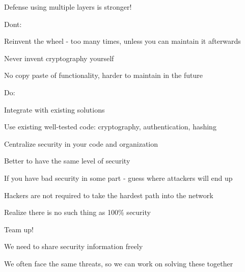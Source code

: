 \documentclass[Screen16to9,17pt]{foils}
\begin{document}


\centerline{\hlkbig Defense using multiple layers is stronger!}



\begin{list1}
\item Dont:
\begin{list2}
\item Reinvent the wheel - too many times, unless you can maintain it afterwards
\item Never invent cryptography yourself
\item No copy paste of functionality, harder to maintain in the future
\end{list2}
\item Do:
\begin{list2}
\item Integrate with existing solutions
\item Use existing well-tested code: cryptography, authentication, hashing
\item Centralize security in your code and organization
\end{list2}
\end{list1}




\begin{list1}
\item Better to have the same level of security
\item If you have bad security in some part - guess where attackers will end up
\item Hackers are not required to take the hardest path into the network
\item Realize there is no such thing as 100\% security
\end{list1}





\begin{list1}
\item Team up!
\item We need to share security information freely
\item We often face the same threats, so we can work on solving these together
\end{list1}
\end{document}
